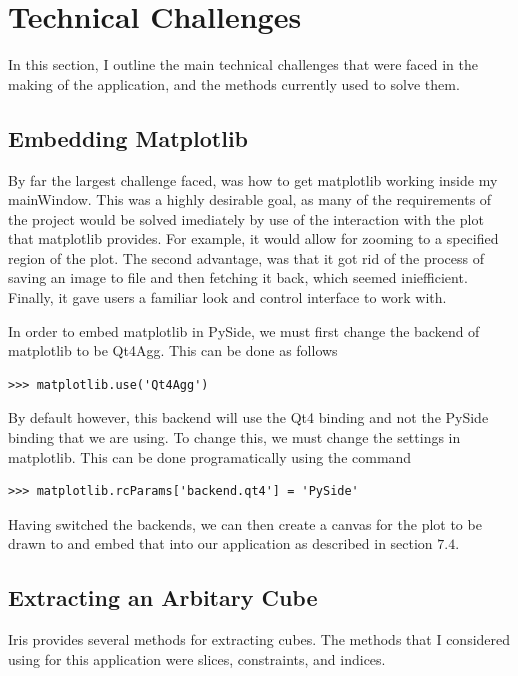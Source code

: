 \documentclass[whitecover]{MO_report}
\begin{document}
\pagebreak

\chapter{Technical Challenges}

In this section, I outline the main technical challenges that were faced in the
making of the application, and the methods currently used to solve them.

\section{Embedding Matplotlib}

By far the largest challenge faced, was how to get matplotlib working inside my
mainWindow. This was a highly desirable goal, as many of the requirements of
the project would be solved imediately by use of the interaction with the plot
that matplotlib provides. For example, it would allow for zooming to a specified
region of the plot. The second advantage,
was that it got rid of the process of saving an image to file and then fetching
it back, which seemed iniefficient. Finally, it gave users a familiar look
and control interface to work with.

In order to embed matplotlib in PySide, we must first change the backend of
matplotlib to be Qt4Agg. This can be done as follows

\begin{verbatim}
>>> matplotlib.use('Qt4Agg')
\end{verbatim}

By default however, this backend will use the Qt4 binding and not the PySide
binding that we are using. To change this, we must change the settings in
matplotlib. This can be done programatically using the command

\begin{verbatim}
>>> matplotlib.rcParams['backend.qt4'] = 'PySide'
\end{verbatim}

Having switched the backends, we can then create a canvas for the plot to be
drawn to and embed that into our application as described in section $7.4$.

\section{Extracting an Arbitary Cube}

Iris provides several methods for extracting cubes. The methods that I
considered using for this application were slices, constraints, and indices.
\end{document}
